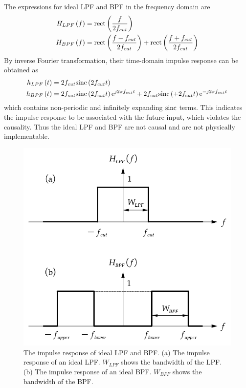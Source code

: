 \documentclass[../ECE459FinalProjectReport.tex]{subfiles}
\begin{document}
The expressions for ideal LPF and BPF in the frequency domain are
\begin{align}
    H_{LPF}\left(f\right) &= \text{rect}\left( \frac{f}{2f_{cut}} \right) \\
    H_{BPF}\left(f\right) &= \text{rect}\left( \frac{f-f_{cut}}{2f_{cut}} \right) + \text{rect}\left( \frac{f+f_{cut}}{2f_{cut}} \right)
\end{align}
By inverse Fourier transformation, their time-domain impulse response can be obtained as
\begin{align}
    h_{LPF}\left(t\right) &= 2f_{cut}\text{sinc}\left(2f_{cut} t\right) \\
    h_{BPF}\left(t\right) &= 2f_{cut}\text{sinc}\left(2f_{cut} t\right)\mathrm{e}^{j2\pi f_{cut} t} + 2f_{cut}\text{sinc}\left(+2f_{cut} t\right)\mathrm{e}^{-j2\pi f_{cut} t}
\end{align}
which contains non-periodic and infinitely expanding $\text{sinc}$ terms. This indicates the impulse response to be associated with the future input, which violates the causality. Thus the ideal LPF and BPF are not causal and are not physically implementable.

\begin{figure}[tb]
    \centering
    \includegraphics[scale=0.6]{plots/ideal-filters.pdf}
    \caption{The impulse response of ideal LPF and BPF. (a) The impulse response of an ideal LPF. $W_{LPF}$ shows the bandwidth of the LPF. (b) The impulse response of an ideal BPF. $W_{BPF}$ shows the bandwidth of the BPF.}
    \label{fig:ideal-filter}
\end{figure}
\end{document}

